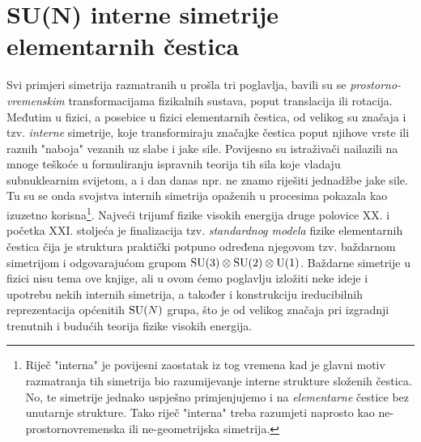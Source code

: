 
\chapter{SU(N) interne simetrije elementarnih čestica}

Svi primjeri simetrija razmatranih u prošla tri poglavlja,
bavili su se \emph{pros\-tor\-no-vre\-men\-skim} transformacijama fizikalnih
sustava, poput translacija ili rotacija.
Međutim u fizici, a posebice u fizici elementarnih čestica,
od velikog su značaja i tzv. \emph{interne} simetrije, koje
transformiraju značajke čestica poput njihove vrste ili
raznih "naboja" vezanih uz slabe i jake sile.
Povijesno su istraživači nailazili na mnoge teškoće u formuliranju
ispravnih teorija tih sila koje vladaju subnuklearnim svijetom,
a i dan danas npr. ne znamo riješiti jednadžbe jake sile. Tu su se onda svojstva internih simetrija
opaženih u procesima pokazala kao izuzetno korisna\footnote{Riječ
    "interna" je povijesni zaostatak iz tog vremena kad je glavni
    motiv razmatranja tih simetrija bio razumijevanje interne strukture složenih
    čestica. No, te simetrije jednako uspješno primjenjujemo i na \emph{elementarne} čestice
    bez unutarnje strukture. Tako riječ "interna" treba razumjeti naprosto
kao ne-prostornovremenska ili ne-geometrijska simetrija.}.
Najveći trijumf fizike visokih energija druge polovice XX. i početka
XXI. stoljeća je finalizacija tzv. \emph{standardnog modela} fizike elementarnih
čestica čija je struktura praktički potpuno određena njegovom
tzv. baždarnom simetrijom i odgovarajućom grupom $\mathrm{SU}(3) \otimes \mathrm{SU}(2) \otimes \mathrm{U}(1)$. 
Baždarne simetrije u fizici nisu tema ove knjige, ali u ovom ćemo poglavlju
izložiti neke ideje i upotrebu nekih internih simetrija, a također
i konstrukciju ireducibilnih reprezentacija općenitih $\mathrm{SU}(N)$ grupa,
što je od velikog značaja pri izgradnji trenutnih i budućih teorija
fizike visokih energija.



